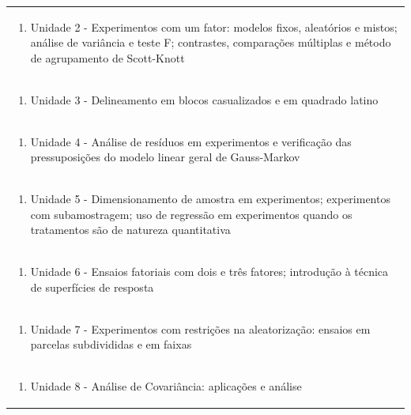 \documentclass[11pt]{article}
\begin{document}
\begin{center}
\begin{longtable}{|p{4cm}|p{4cm}|p{4cm}|p{4cm}|}
\multicolumn{4}{|p{\dimexpr 16cm + 6\tabcolsep\relax}|}{\begin{enumerate}[start=2]\item Unidade 2 - Experimentos com um fator: modelos fixos, aleatórios e mistos; análise de variância e teste F; contrastes, comparações múltiplas e método de agrupamento de Scott-Knott\end{enumerate}}\\
\multicolumn{4}{|p{\dimexpr 16cm + 6\tabcolsep\relax}|}{\begin{enumerate}[start=3]\item Unidade 3 - Delineamento em blocos casualizados e em quadrado latino\end{enumerate}}\\
\multicolumn{4}{|p{\dimexpr 16cm + 6\tabcolsep\relax}|}{\begin{enumerate}[start=4]\item Unidade 4 - Análise de resíduos em experimentos e verificação das pressuposições do modelo linear geral de Gauss-Markov\end{enumerate}}\\
\multicolumn{4}{|p{\dimexpr 16cm + 6\tabcolsep\relax}|}{\begin{enumerate}[start=5]\item Unidade 5 - Dimensionamento de amostra em experimentos; experimentos com subamostragem; uso de regressão em experimentos quando os tratamentos são de natureza quantitativa\end{enumerate}}\\
\multicolumn{4}{|p{\dimexpr 16cm + 6\tabcolsep\relax}|}{\begin{enumerate}[start=6]\item Unidade 6 - Ensaios fatoriais com dois e três fatores; introdução à técnica de superfícies de resposta\end{enumerate}}\\
\multicolumn{4}{|p{\dimexpr 16cm + 6\tabcolsep\relax}|}{\begin{enumerate}[start=7]\item Unidade 7 - Experimentos com restrições na aleatorização: ensaios em parcelas subdivididas e em faixas\end{enumerate}}\\
\multicolumn{4}{|p{\dimexpr 16cm + 6\tabcolsep\relax}|}{\begin{enumerate}[start=8]\item Unidade 8 - Análise de Covariância: aplicações e análise\end{enumerate}}\\

\end{longtable}
\end{center}
\end{document}
